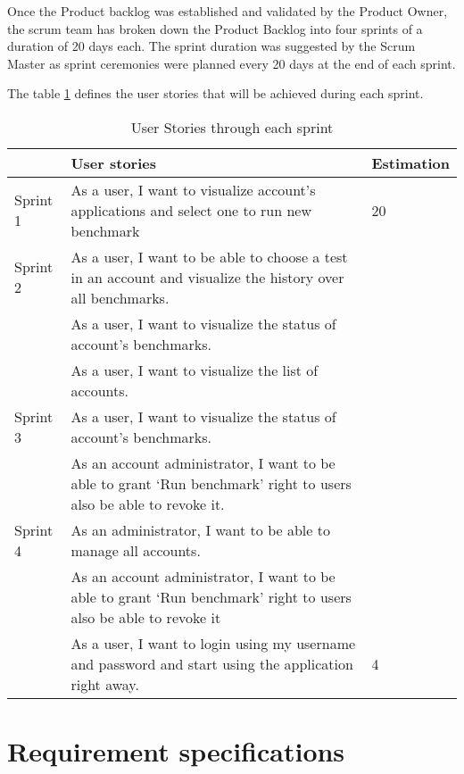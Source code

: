 Once the Product backlog was established and validated by the Product Owner, the
scrum team has broken down the Product Backlog into four sprints of a duration
of 20 days each. The sprint duration was suggested by the Scrum Master as sprint
ceremonies were planned every 20 days at the end of each sprint.

The table \hyperref[sprints]{\ref{sprints}} defines the user stories that will
be achieved during each sprint.

\begin{table}[]
\centering
\label{sprints}
\begin{tabular}{|p{2cm}|p{7cm}|p{2cm}|}
                           \hline
                          &  User stories & Estimation \\ \hline
Sprint 1                 &  As a user, I want to visualize account’s applications and select one to run new benchmark &  20\\ \hline
{\multirow{3}{*}{}} Sprint 2 &  As a user, I want to be able to choose a test in an account and visualize the history over all benchmarks.&  \\ \cline{2-3} 
{}                  &  As a user, I want to visualize the status of account’s benchmarks. &  \\ \cline{2-3} 
{}                  & As a user, I want to visualize the list of accounts. &  \\ \hline
{\multirow{2}{*}{}} Sprint 3 & As a user, I want to visualize the status of account’s benchmarks. &  \\ \cline{2-3} 
{}                  &  As an account administrator, I want to be able to grant ‘Run benchmark’  right to users also be able to revoke it.&  \\ \hline
{\multirow{3}{*}{}} Sprint 4 &  As an administrator, I want to be able to manage all accounts. &  \\ \cline{2-3} 
{}                  &  As an account administrator, I want to be able to grant ‘Run benchmark’  right to users also be able to revoke it&  \\ \cline{2-3} 
{}                  & As a user, I want to login using my username and password and start using the application right away. & 4  \\ \hline
\end{tabular}
\caption{User Stories through each sprint}
\end{table}
\section{Requirement specifications}
